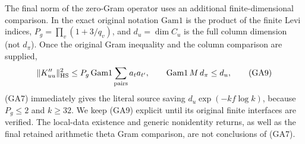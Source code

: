 The final norm of the zero-Gram operator uses an additional
finite-dimensional comparison. In the exact original notation
\(\mathrm{Gam1}\) is the product of the finite Levi indices,
\(P_g=\prod_v(1+3/q_v)\), and \(d_u=\dim C_u\) is the full
column dimension (not \(d_\pi\)). Once the original Gram inequality
and the column comparison are supplied,
\[
 \|K''_{uu}\|_{\rm HS}^2
 \le P_g\,\mathrm{Gam1}\sum_{\rm pairs}a_ta_{t'},\qquad
 \mathrm{Gam1}\,M\,d_\pi\le d_u ,
 \tag{GA9}
\]
(GA7) immediately gives the literal source saving
\(d_u\exp(-kf\log k)\), because \(P_g\le2\) and
\(k\ge32\). We keep (GA9) explicit until its original finite
interfaces are verified. The local-data existence and generic
nonidentity returns, as well as the final retained arithmetic
theta Gram comparison, are not conclusions of (GA7).
